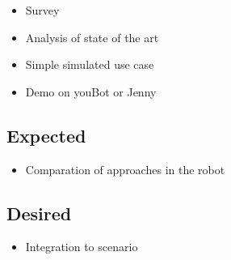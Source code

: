 \documentclass[rnd]{mas_proposal}
\begin{document}
\begin{itemize}
    \item Survey
    \item Analysis of state of the art
    \item Simple simulated use case
    \item Demo on youBot or Jenny
\end{itemize}

\subsection{Expected}
\begin{itemize}
    \item Comparation of approaches in the robot
\end{itemize}

\subsection{Desired}
\begin{itemize}
    \item Integration to scenario
\end{itemize}


\nocite{*}

\end{document}

